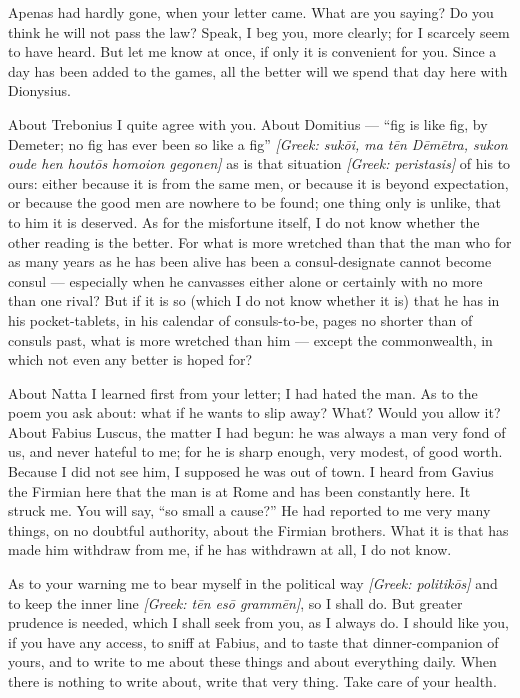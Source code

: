 

 Apenas had hardly gone, when your letter came. What are you saying? Do you think he will not pass the law? Speak, I beg you, more clearly; for I scarcely seem to have heard. But let me know at once, if only it is convenient for you. Since a day has been added to the games, all the better will we spend that day here with Dionysius.

 About Trebonius I quite agree with you. About Domitius --- ``fig is like fig, by Demeter; no fig has ever been so like a fig'' \textit{[Greek: suk\=oi, ma t\=en D\=em\=etra, sukon oude hen hout\=os homoion gegonen]} as is that situation \textit{[Greek: peristasis]} of his to ours: either because it is from the same men, or because it is beyond expectation, or because the good men are nowhere to be found; one thing only is unlike, that to him it is deserved. As for the misfortune itself, I do not know whether the other reading is the better. For what is more wretched than that the man who for as many years as he has been alive has been a consul-designate cannot become consul --- especially when he canvasses either alone or certainly with no more than one rival? But if it is so (which I do not know whether it is) that he has in his pocket-tablets, in his calendar of consuls-to-be, pages no shorter than of consuls past, what is more wretched than him --- except the commonwealth, in which not even any better is hoped for?

 About Natta I learned first from your letter; I had hated the man. As to the poem you ask about: what if he wants to slip away? What? Would you allow it? About Fabius Luscus, the matter I had begun: he was always a man very fond of us, and never hateful to me; for he is sharp enough, very modest, of good worth. Because I did not see him, I supposed he was out of town. I heard from Gavius the Firmian here that the man is at Rome and has been constantly here. It struck me. You will say, ``so small a cause?'' He had reported to me very many things, on no doubtful authority, about the Firmian brothers. What it is that has made him withdraw from me, if he has withdrawn at all, I do not know.

 As to your warning me to bear myself in the political way \textit{[Greek: politik\=os]} and to keep the inner line \textit{[Greek: t\=en es\=o gramm\=en]}, so I shall do. But greater prudence is needed, which I shall seek from you, as I always do. I should like you, if you have any access, to sniff at Fabius, and to taste that dinner-companion of yours, and to write to me about these things and about everything daily. When there is nothing to write about, write that very thing. Take care of your health.
